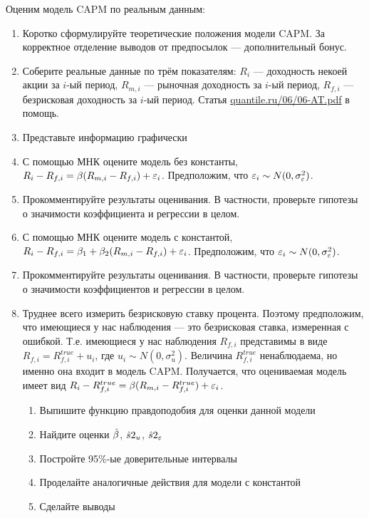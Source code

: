 \documentclass[12pt, a4paper]{article}
\begin{document}
Оценим модель CAPM по реальным данным:
\begin{enumerate}
\item Коротко сформулируйте теоретические положения модели CAPM. За корректное отделение выводов от предпосылок — дополнительный бонус.
\item Соберите реальные данные по трём показателям: $R_i$ — доходность некоей акции за $i$-ый период, $R_{m,i}$ — рыночная доходность за $i$-ый период, $R_{f,i}$ — безрисковая доходность за $i$-ый период. Статья \href{http://quantile.ru/06/06-AT.pdf}{quantile.ru/06/06-AT.pdf} в помощь.
\item Представьте информацию графически
\item С помощью МНК оцените модель без константы, $R_i-R_{f,i}=\beta (R_{m,i}-R_{f,i})+\varepsilon_i$. Предположим, что $\varepsilon_i \sim N(0,\sigma_{\varepsilon}^2)$.
\item Прокомментируйте результаты оценивания. В частности, проверьте гипотезы о значимости коэффициента и регрессии в целом.
\item С помощью МНК оцените модель с константой, $R_i-R_{f,i}=\beta_1 + \beta_2 (R_{m,i}-R_{f,i})+\varepsilon_i$. Предположим, что $\varepsilon_i \sim N(0,\sigma_{\varepsilon}^2)$.
\item Прокомментируйте результаты оценивания. В частности, проверьте гипотезы о значимости коэффициентов и регрессии в целом.
\item Труднее всего измерить безрисковую ставку процента. Поэтому предположим, что имеющиеся у нас наблюдения — это безрисковая ставка, измеренная с ошибкой. Т.е. имеющиеся у нас наблюдения $R_{f,i}$ представимы в виде $R_{f,i}=R_{f,i}^{true}+u_i$, где $u_i \sim N(0,\sigma^2_u)$. Величина $R_{f,i}^{true}$ ненаблюдаема, но именно она входит в модель CAPM. Получается, что оцениваемая модель имеет вид $R_i-R_{f,i}^{true}=\beta (R_{m,i}-R_{f,i}^{true})+\varepsilon_i$.
\begin{enumerate}
\item Выпишите функцию правдоподобия для оценки данной модели
\item Найдите оценки $\hat{\beta}$, $\hat{s}2_{u}$, $\hat{s}2_{\varepsilon}$
\item Постройте 95\%-ые доверительные интервалы
\item Проделайте аналогичные действия для модели с константой
\item Сделайте выводы
\end{enumerate}

\end{enumerate}
\end{document}
